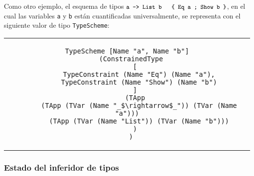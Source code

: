 Como otro ejemplo, el esquema de tipos 
${\small \texttt{a -> List b \ \ \{ Eq a ; Show b \}}}$,
en el cual las variables \verb|a| y \verb|b| están cuantificadas
universalmente,
se representa con el siguiente valor de tipo \verb|TypeScheme|:
\begin{center}
\begin{tabular}{c}
\begin{lstlisting}[mathescape=true]
TypeScheme [Name "a", Name "b"]
  (ConstrainedType
    [
      TypeConstraint (Name "Eq") (Name "a"),
      TypeConstraint (Name "Show") (Name "b")
    ]
    (TApp
      (TApp (TVar (Name "_$\rightarrow$_")) (TVar (Name "a")))
      (TApp (TVar (Name "List")) (TVar (Name "b")))
    )
  )
\end{lstlisting}
\end{tabular}
\end{center}

\subsubsection{Estado del inferidor de tipos}

